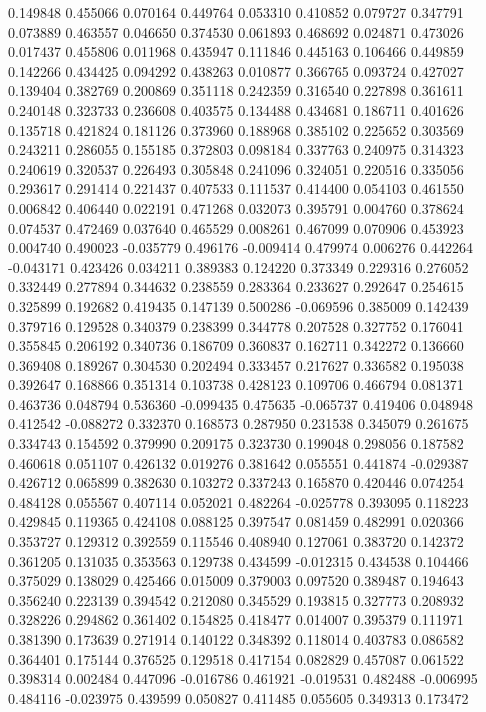 0.149848
0.455066
0.070164
0.449764
0.053310
0.410852
0.079727
0.347791
0.073889
0.463557
0.046650
0.374530
0.061893
0.468692
0.024871
0.473026
0.017437
0.455806
0.011968
0.435947
0.111846
0.445163
0.106466
0.449859
0.142266
0.434425
0.094292
0.438263
0.010877
0.366765
0.093724
0.427027
0.139404
0.382769
0.200869
0.351118
0.242359
0.316540
0.227898
0.361611
0.240148
0.323733
0.236608
0.403575
0.134488
0.434681
0.186711
0.401626
0.135718
0.421824
0.181126
0.373960
0.188968
0.385102
0.225652
0.303569
0.243211
0.286055
0.155185
0.372803
0.098184
0.337763
0.240975
0.314323
0.240619
0.320537
0.226493
0.305848
0.241096
0.324051
0.220516
0.335056
0.293617
0.291414
0.221437
0.407533
0.111537
0.414400
0.054103
0.461550
0.006842
0.406440
0.022191
0.471268
0.032073
0.395791
0.004760
0.378624
0.074537
0.472469
0.037640
0.465529
0.008261
0.467099
0.070906
0.453923
0.004740
0.490023
-0.035779
0.496176
-0.009414
0.479974
0.006276
0.442264
-0.043171
0.423426
0.034211
0.389383
0.124220
0.373349
0.229316
0.276052
0.332449
0.277894
0.344632
0.238559
0.283364
0.233627
0.292647
0.254615
0.325899
0.192682
0.419435
0.147139
0.500286
-0.069596
0.385009
0.142439
0.379716
0.129528
0.340379
0.238399
0.344778
0.207528
0.327752
0.176041
0.355845
0.206192
0.340736
0.186709
0.360837
0.162711
0.342272
0.136660
0.369408
0.189267
0.304530
0.202494
0.333457
0.217627
0.336582
0.195038
0.392647
0.168866
0.351314
0.103738
0.428123
0.109706
0.466794
0.081371
0.463736
0.048794
0.536360
-0.099435
0.475635
-0.065737
0.419406
0.048948
0.412542
-0.088272
0.332370
0.168573
0.287950
0.231538
0.345079
0.261675
0.334743
0.154592
0.379990
0.209175
0.323730
0.199048
0.298056
0.187582
0.460618
0.051107
0.426132
0.019276
0.381642
0.055551
0.441874
-0.029387
0.426712
0.065899
0.382630
0.103272
0.337243
0.165870
0.420446
0.074254
0.484128
0.055567
0.407114
0.052021
0.482264
-0.025778
0.393095
0.118223
0.429845
0.119365
0.424108
0.088125
0.397547
0.081459
0.482991
0.020366
0.353727
0.129312
0.392559
0.115546
0.408940
0.127061
0.383720
0.142372
0.361205
0.131035
0.353563
0.129738
0.434599
-0.012315
0.434538
0.104466
0.375029
0.138029
0.425466
0.015009
0.379003
0.097520
0.389487
0.194643
0.356240
0.223139
0.394542
0.212080
0.345529
0.193815
0.327773
0.208932
0.328226
0.294862
0.361402
0.154825
0.418477
0.014007
0.395379
0.111971
0.381390
0.173639
0.271914
0.140122
0.348392
0.118014
0.403783
0.086582
0.364401
0.175144
0.376525
0.129518
0.417154
0.082829
0.457087
0.061522
0.398314
0.002484
0.447096
-0.016786
0.461921
-0.019531
0.482488
-0.006995
0.484116
-0.023975
0.439599
0.050827
0.411485
0.055605
0.349313
0.173472
